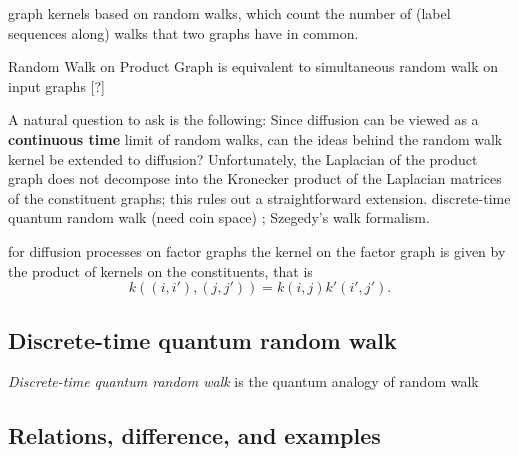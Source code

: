 graph kernels based on random walks, which count the number of (label sequences along) walks that two graphs have in common.
\begin{remark}
	Random Walk on Product Graph is equivalent to simultaneous random walk on input graphs [?]
\end{remark}
\begin{remark}
	A natural question to ask is the following: Since diffusion can be viewed as a \textbf{continuous time} limit of random walks, can the ideas behind the random walk kernel be extended to diffusion? Unfortunately, the Laplacian of the product graph does not decompose into the Kronecker product of the Laplacian matrices of the constituent graphs; this rules out a straightforward extension.
	discrete-time quantum random walk (need coin space) \cite{ambainisCoinsMakeQuantum2005} \cite{childsQuantumInformationProcessing2004};
	Szegedy's walk formalism.
	\cite{szegedySpectraQuantizedWalks2004}
\end{remark}
\begin{remark}
	for diﬀusion processes on factor graphs the kernel on the factor graph is given by the product of kernels on the constituents, that is 
	\begin{equation}
		k((i, i'), (j, j')) = k(i, j) k' (i' , j' ).
	\end{equation}
\end{remark}

\subsection{Discrete-time quantum random walk}
\emph{Discrete-time quantum random walk} is the quantum analogy of random walk

\subsection{Relations, difference, and examples}
